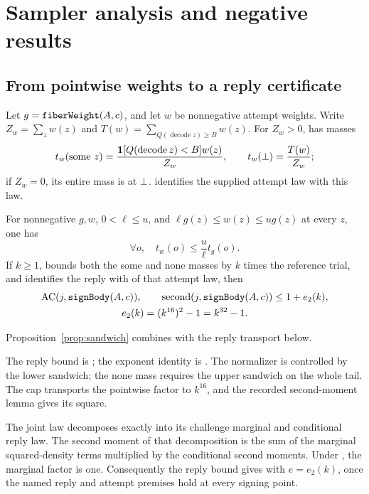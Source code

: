\section{Sampler analysis and negative results}\label{sec:sampler}
\subsection{From pointwise weights to a reply certificate}
Let $g=\code{fiberWeight}(A,c)$, and let $w$ be nonnegative attempt
weights. Write $Z_w=\sum_z w(z)$ and
$T(w)=\sum_{Q(\operatorname{decode}z)\geq B}w(z)$.
For $Z_w>0$,  has masses
\[
 t_w(\mathrm{some}\ z)=\frac{\ind[Q(\operatorname{decode}z)<B]w(z)}{Z_w},
 \qquad t_w(\none)=\frac{T(w)}{Z_w};
\]
if $Z_w=0$, its entire mass is at $\bot$.
 identifies the supplied attempt law with this law.

\begin{proposition}\label{prop:sandwich}
For nonnegative $g,w$, $0<\ell\leq u$, and
$\ell g(z)\leq w(z)\leq u g(z)$ at every $z$, one has
\[
 \forall o,\quad t_w(o)\leq\frac{u}{\ell}t_g(o).
\]
If $k\geq1$,  bounds both the some and none
masses by $k$ times the reference trial, and  identifies
the reply with  of that attempt law, then
\begin{gather*}
 \AC(j,\code{signBody}(A,c)),\qquad
 \Second(j,\code{signBody}(A,c))\leq1+e_2(k),\\
 e_2(k)=(k^{16})^2-1=k^{32}-1.
\end{gather*}
\end{proposition}
Proposition~\ref{prop:sandwich} combines
 with the reply transport below.

The reply bound is ; the exponent identity
is .
The normalizer is controlled by the lower sandwich; the none mass
requires the upper sandwich on the whole tail. The cap transports the
pointwise factor to $k^{16}$, and the recorded second-moment lemma gives
its square.

The joint law decomposes exactly into its challenge marginal and
conditional reply law. The second moment of that decomposition is the
sum of the marginal squared-density terms multiplied by the conditional
second moments. Under , the marginal factor is
one. Consequently the reply bound gives 
with $e=e_2(k)$, once the named reply and attempt premises hold at every
signing point.

